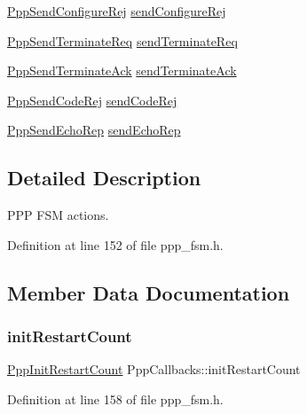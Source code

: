 \begin{DoxyCompactItemize}
\item 
\hyperlink{ppp__fsm_8h_a07e77c278b7ef0ae6032209a2a2e9355}{Ppp\+Send\+Configure\+Rej} \hyperlink{structPppCallbacks_ab3f96661dba20a0d51d08bfc395519f7}{send\+Configure\+Rej}
\item 
\hyperlink{ppp__fsm_8h_a38c40607763e08bb9d1d2fce149c0649}{Ppp\+Send\+Terminate\+Req} \hyperlink{structPppCallbacks_a0a8578c4f6f59b0db9ffb1f9cd661024}{send\+Terminate\+Req}
\item 
\hyperlink{ppp__fsm_8h_a63a08a28d6915a0b14a6262ed45da948}{Ppp\+Send\+Terminate\+Ack} \hyperlink{structPppCallbacks_a939301e4eed7462430bba254a6bf820b}{send\+Terminate\+Ack}
\item 
\hyperlink{ppp__fsm_8h_ac334e06c25673bbec798aa1bdf46e91e}{Ppp\+Send\+Code\+Rej} \hyperlink{structPppCallbacks_ab8237b5d2c93c01190c790d63a1ae720}{send\+Code\+Rej}
\item 
\hyperlink{ppp__fsm_8h_a90deee6d649b10694b4c962bd1ec2946}{Ppp\+Send\+Echo\+Rep} \hyperlink{structPppCallbacks_a7b6d16374b35c43b82f7b3da0dbc87da}{send\+Echo\+Rep}
\end{DoxyCompactItemize}


\subsection{Detailed Description}
P\+PP F\+SM actions. 

Definition at line 152 of file ppp\+\_\+fsm.\+h.



\subsection{Member Data Documentation}
\mbox{\label{structPppCallbacks_aa601353760cb64fb60bf207e1fd9c281}} 
\subsubsection{\texorpdfstring{init\+Restart\+Count}{initRestartCount}}
{\footnotesize\ttfamily \hyperlink{ppp__fsm_8h_a65f1f9ed4177c139c61a532328cc4bbc}{Ppp\+Init\+Restart\+Count} Ppp\+Callbacks\+::init\+Restart\+Count}



Definition at line 158 of file ppp\+\_\+fsm.\+h.

